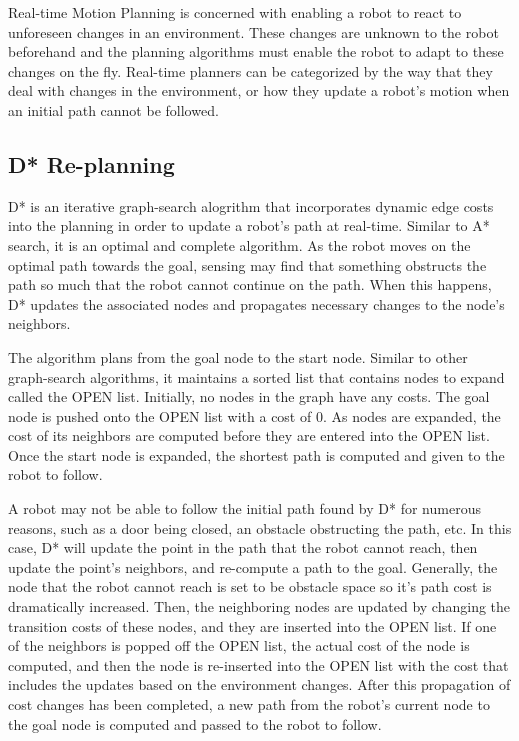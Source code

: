\documentclass[10pt,conference]{ieeeconf}
\begin{document}
Real-time Motion Planning is concerned with enabling a robot to react to unforeseen changes in an environment. These changes are unknown to the robot beforehand and the planning algorithms must enable the robot to adapt to these changes on the fly. Real-time planners can be categorized by the way that they deal with changes in the environment, or how they update a robot's motion when an initial path cannot be followed.


\subsection{D* Re-planning} \label{sec:dstar}

D* \cite{stentz1994optimal} is an iterative graph-search alogrithm that incorporates dynamic edge costs into the planning in order to update a robot's path at real-time. Similar to A* search, it is an optimal and complete algorithm. As the robot moves on the optimal path towards the goal, sensing may find that something obstructs the path so much that the robot cannot continue on the path. When this happens, D* updates the associated nodes and propagates necessary changes to the node's neighbors.

The algorithm plans from the goal node to the start node. Similar to other graph-search algorithms, it maintains a sorted list that contains nodes to expand called the OPEN list. Initially, no nodes in the graph have any costs. The goal node is pushed onto the OPEN list with a cost of 0. As nodes are expanded, the cost of its neighbors are computed before they are entered into the OPEN list. Once the start node is expanded, the shortest path is computed and given to the robot to follow.

A robot may not be able to follow the initial path found by D* for numerous reasons, such as a door being closed, an obstacle obstructing the path, etc. In this case, D* will update the point in the path that the robot cannot reach, then update the point's neighbors, and re-compute a path to the goal. Generally, the node that the robot cannot reach is set to be obstacle space so it's path cost is dramatically increased. Then, the neighboring nodes are updated by changing the transition costs of these nodes, and they are inserted into the OPEN list. If one of the neighbors is popped off the OPEN list, the actual cost of the node is computed, and then the node is re-inserted into the OPEN list with the cost that includes the updates based on the environment changes. After this propagation of cost changes has been completed, a new path from the robot's current node to the goal node is computed and passed to the robot to follow.
\end{document}
